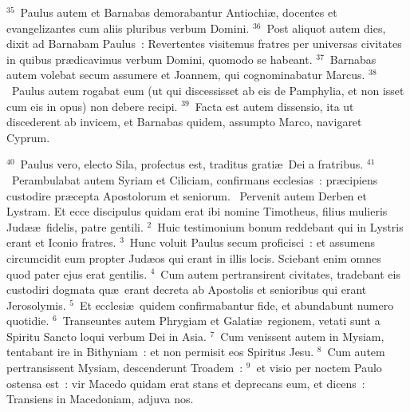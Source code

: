 ${}^{35}$~Paulus autem et Barnabas demorabantur Antiochi\ae , docentes et evangelizantes cum aliis pluribus verbum Domini.
${}^{36}$~Post aliquot autem dies, dixit ad Barnabam Paulus~: Revertentes visitemus fratres per universas civitates in quibus pr\ae dicavimus verbum Domini, quomodo se habeant.
${}^{37}$~Barnabas autem volebat secum assumere et Joannem, qui cognominabatur Marcus.
${}^{38}$~Paulus autem rogabat eum (ut qui discessisset ab eis de Pamphylia, et non isset cum eis in opus) non debere recipi.
${}^{39}$~Facta est autem dissensio, ita ut discederent ab invicem, et Barnabas quidem, assumpto Marco, navigaret Cyprum.


${}^{40}$~Paulus vero, electo Sila, profectus est, traditus grati\ae\ Dei a fratribus.
${}^{41}$~Perambulabat autem Syriam et Ciliciam, confirmans ecclesias~: pr\ae cipiens custodire pr\ae cepta Apostolorum et seniorum.
~Pervenit autem Derben et Lystram. Et ecce discipulus quidam erat ibi nomine Timotheus, filius mulieris Jud\ae \ae\ fidelis, patre gentili.
${}^{2}$~Huic testimonium bonum reddebant qui in Lystris erant et Iconio fratres.
${}^{3}$~Hunc voluit Paulus secum proficisci~: et assumens circumcidit eum propter Jud\ae os qui erant in illis locis. Sciebant enim omnes quod pater ejus erat gentilis.
${}^{4}$~Cum autem pertransirent civitates, tradebant eis custodiri dogmata qu\ae\ erant decreta ab Apostolis et senioribus qui erant Jerosolymis.
${}^{5}$~Et ecclesi\ae\ quidem confirmabantur fide, et abundabunt numero quotidie.
${}^{6}$~Transeuntes autem Phrygiam et Galati\ae\ regionem, vetati sunt a Spiritu Sancto loqui verbum Dei in Asia.
${}^{7}$~Cum venissent autem in Mysiam, tentabant ire in Bithyniam~: et non permisit eos Spiritus Jesu.
${}^{8}$~Cum autem pertransissent Mysiam, descenderunt Troadem~:
${}^{9}$~et visio per noctem Paulo ostensa est~: vir Macedo quidam erat stans et deprecans eum, et dicens~: Transiens in Macedoniam, adjuva nos.


